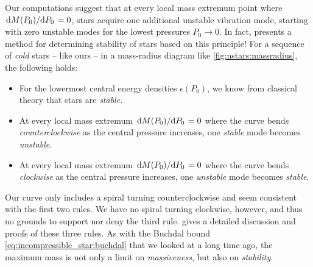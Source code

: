 Our computations suggest that at every local mass extremum point where $\odv{M(P_0)}/{P_0} = 0$, stars acquire one additional unstable vibration mode, starting with zero unstable modes for the lowest pressures $P_0 \rightarrow 0$.
In fact, \cite{ref:stability_methods} presents a method for determining stability of stars based on this principle!
For a sequence of \emph{cold} stars -- like ours -- in a mass-radius diagram like \cref{fig:nstars:massradius}, the following holds:
\begin{itemize}
\item For the lowermost central energy densities $\epsilon(P_0)$, we know from classical theory that stars are \emph{stable}.
\item At every local mass extremum $\odv{M(P_0)}/{P_0} = 0$ where the curve bends \emph{counterclockwise} as the central pressure increases, one \emph{stable} mode becomes \emph{unstable}.
\item At every local mass extremum $\odv{M(P_0)}/{P_0} = 0$ where the curve bends \emph{clockwise} as the central pressure increases, one \emph{unstable} mode becomes \emph{stable}.
\end{itemize}
Our curve only includes a spiral turning counterclockwise and seem consistent with the first two rules.
We have no spiral turning clockwise, however, and thus no grounds to support nor deny the third rule. 
\cite{ref:stability_rules_thorne} gives a detailed discussion and proofs of these three rules.
As with the Buchdal bound \eqref{eq:incompressible_star:buchdal} that we looked at a long time ago, the maximum mass is not only a limit on \emph{massiveness}, but also on \emph{stability}.


